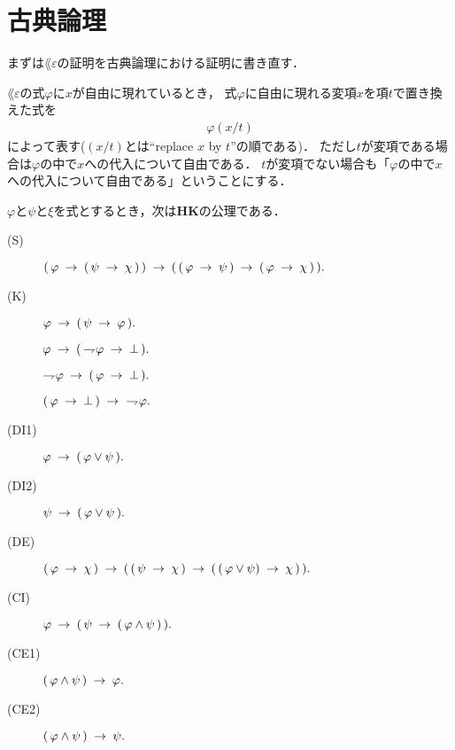 \section{古典論理}
	まずは$\lang{\varepsilon}$の証明を古典論理における証明に書き直す．
	
	$\lang{\varepsilon}$の式$\varphi$に$x$が自由に現れているとき，
	式$\varphi$に自由に現れる変項$x$を項$t$で置き換えた式を
	\begin{align}
		\varphi(x/t)
	\end{align}
	によって表す($(x/t)$とは``replace $x$ by $t$''の順である)．
	ただし$t$が変項である場合は$\varphi$の中で$x$への代入について自由である．
	$t$が変項でない場合も「$\varphi$の中で$x$への代入について自由である」ということにする．
	
	\begin{screen}
		\begin{logicalaxm}
			$\varphi$と$\psi$と$\xi$を式とするとき，次は{\bf HK}の公理である．
			\begin{description}
				\item[(S)] $(\, \varphi \rarrow (\, \psi \rarrow \chi\, )\, ) 
					\rarrow (\, (\, \varphi \rarrow \psi\, )
					\rarrow (\, \varphi \rarrow \chi\, )\, ).$
				\item[(K)] $\varphi \rarrow (\, \psi \rarrow \varphi\, ).$
				\item[] $\varphi \rarrow (\, \negation \varphi \rarrow \bot\, ).$
				\item[] $\negation \varphi \rarrow (\, \varphi \rarrow \bot\, ).$
				\item[] $(\, \varphi \rarrow \bot\, ) \rarrow\ \negation \varphi.$
				\item[(DI1)] $\varphi \rarrow (\, \varphi \vee \psi\, ).$
				\item[(DI2)] $\psi \rarrow (\, \varphi \vee \psi\, ).$
				\item[(DE)] $(\, \varphi \rarrow \chi\, ) \rarrow 
					(\, (\, \psi \rarrow \chi\, ) 
					\rarrow (\, (\, \varphi \vee \psi) \rarrow \chi\, )\, ).$
				\item[(CI)] $\varphi \rarrow (\, \psi \rarrow (\, \varphi \wedge \psi\, )\, ).$
				\item[(CE1)] $(\, \varphi \wedge \psi\, ) \rarrow \varphi.$
				\item[(CE2)] $(\, \varphi \wedge \psi\, ) \rarrow \psi.$
			\end{description}
		\end{logicalaxm}
	\end{screen}
	

